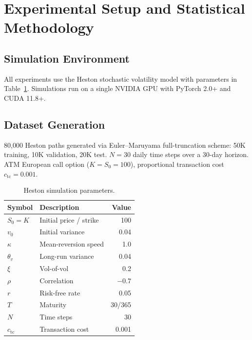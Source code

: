
\section{Experimental Setup and Statistical Methodology}
\label{sec:setup}

\subsection{Simulation Environment}

All experiments use the Heston stochastic volatility model with parameters in Table~\ref{tab:heston_params_setup}. Simulations run on a single NVIDIA GPU with PyTorch 2.0+ and CUDA 11.8+.

\subsection{Dataset Generation}

80,000 Heston paths generated via Euler--Maruyama full-truncation scheme: 50K training, 10K validation, 20K test. $N = 30$ daily time steps over a 30-day horizon. ATM European call option ($K = S_0 = 100$), proportional transaction cost $c_{\mathrm{tc}} = 0.001$.

\begin{table}[H]
\centering\small
\caption{Heston simulation parameters.}
\label{tab:heston_params_setup}
\begin{tabular}{@{}llr@{}}
\toprule
\textbf{Symbol} & \textbf{Description} & \textbf{Value} \\\midrule
$S_0 = K$ & Initial price / strike & 100 \\
$v_0$ & Initial variance & 0.04 \\
$\kappa$ & Mean-reversion speed & 1.0 \\
$\theta_v$ & Long-run variance & 0.04 \\
$\xi$ & Vol-of-vol & 0.2 \\
$\rho$ & Correlation & $-0.7$ \\
$r$ & Risk-free rate & 0.05 \\
$T$ & Maturity & 30/365 \\
$N$ & Time steps & 30 \\
$c_{\mathrm{tc}}$ & Transaction cost & 0.001 \\
\bottomrule
\end{tabular}
\end{table}

